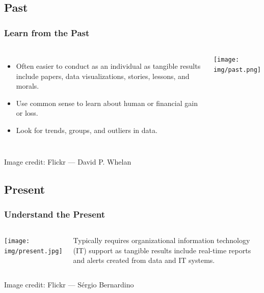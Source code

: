 \documentclass[11pt,
               aspectratio=169
               ]{beamer}
\begin{document}
	
	\subsection{Past}
		
		\begin{frame}
		
			\frametitle{Learn from the Past}
		
			\begin{columns}
				
				\vspace{-15pt}
				\begin{itemize}
					\item Often easier to conduct as an individual as tangible results include papers, data visualizations, stories, lessons, and morals.
					\item Use common sense to learn about human or financial gain or loss.
					\item Look for trends, groups, and outliers in data.
				\end{itemize}

				\centering
				\texttt{[image: img/past.png]}
				
				
	
			\end{columns}
		
			\tiny Image credit: Flickr --- David P. Whelan
		
		\end{frame}

	\subsection{Present}

		\begin{frame}
		
			\frametitle{Understand the Present}
		
			\begin{columns}
			
				\column{0.5\linewidth}
				\centering
				\texttt{[image: img/present.jpg]}
			
				\column{0.45\linewidth}
					Typically requires organizational information technology (IT) support as tangible results include real-time reports and alerts created from data and IT systems.  
			\end{columns}
		
			\vspace{10pt}
		
			\tiny Image credit: Flickr --- Sérgio Bernardino
		
		\end{frame}	
		
\end{document}
